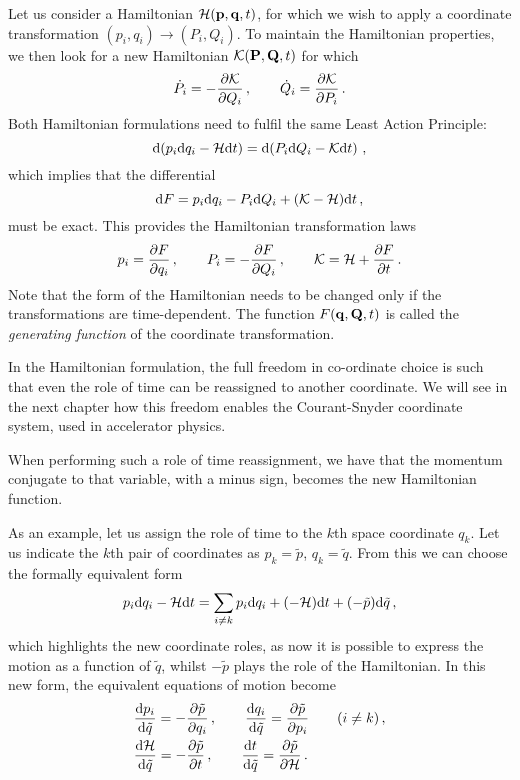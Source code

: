 Let us consider a Hamiltonian $\mathcal{H}(\vb{p},\vb{q},t)$, for which we wish to apply a coordinate transformation $(p_i,q_i)\to(P_i,Q_i)$. To maintain the Hamiltonian properties, we then look for a new Hamiltonian $\mathcal{K}(\vb{P},\vb{Q},t)$ for which
%
\begin{equation}
    \dot P_i = -\pdv{\mathcal{K}}{Q_i}\,, \qquad \dot Q_i = \pdv{\mathcal{K}}{P_i}\,.
\end{equation}
%
Both Hamiltonian formulations need to fulfil the same Least Action Principle:
%
\begin{equation}
    \dd (p_i \dd q_i- \mathcal{H} \dd t) = \dd(P_i \dd Q_i - \mathcal{K}\dd t)\,,
\end{equation}
%
which implies that the differential
%
\begin{equation}
    \dd F = p_i\dd q_i - P_i \dd Q_i + (\mathcal{K}-\mathcal{H})\dd t\, ,
\end{equation}
%
must be exact. This provides the Hamiltonian transformation laws
%
\begin{equation} 
	p_i = \pdv{F}{q_i}\,, \qquad P_i = -\pdv{F}{Q_i}\,, \qquad \mathcal{K}=\mathcal{H}+\pdv{F}{t}\,.
\end{equation}
%
Note that the form of the Hamiltonian needs to be changed only if the transformations are time-dependent. The function $F(\vb{q},\vb{Q},t)$ is called the \textit{generating function} of the coordinate transformation.

In the Hamiltonian formulation, the full freedom in co-ordinate choice is such that even the role of time can be reassigned to another coordinate. We will see in the next chapter how this freedom enables the Courant-Snyder coordinate system, used in accelerator physics.

When performing such a role of time reassignment, we have that the momentum conjugate to that variable, with a minus sign, becomes the new Hamiltonian function.

As an example, let us assign the role of time to the $k$th space coordinate $q_k$. Let us indicate the $k$th pair of coordinates as $p_k = \tilde p$, $q_k=\tilde q$. From this we can choose the formally equivalent form
%
\begin{equation}
    p_i \dd q_i - \mathcal{H} \dd t = \sum_{i\neq k} p_i \dd q_i + (-\mathcal{H})\dd t + (-\tilde p)\dd\tilde q\,,
\end{equation}
%
which highlights the new coordinate roles, as now it is possible to express the motion as a function of $\tilde q$, whilst $-\tilde p$ plays the role of the Hamiltonian. In this new form, the equivalent equations of motion become
%
\begin{equation} 
\begin{split}
	&\dv{p_i}{\tilde q} = -\pdv{\tilde p}{q_i}\,, \qquad \dv{q_i}{\tilde q} = \pdv{\tilde p}{p_i} \qquad (i\neq k)\,, \\
	&\dv{\mathcal{H}}{\tilde q} = -\pdv{\tilde p}{t}\,,  \qquad \dv{t}{\tilde q} = \pdv{\tilde p}{\mathcal{H}}\,. 
\end{split}
\end{equation}

